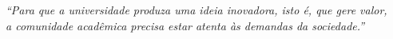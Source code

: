 


\vspace*{\fill} %
\begin{flushright}
\textit{``Para que a universidade produza uma ideia inovadora, isto é, que gere valor,\\
a comunidade acadêmica precisa estar atenta às demandas da sociedade.''\\
\cite{correa2021}}
\end{flushright}
\vspace*{1cm} %

\newpage